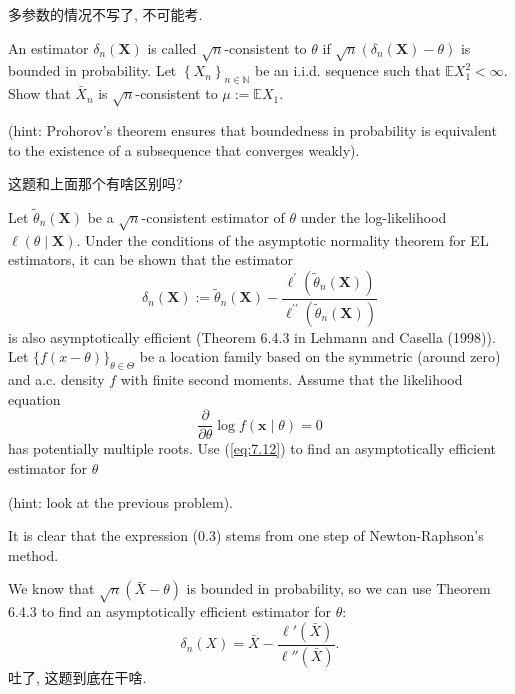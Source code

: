 \begin{solution}
    多参数的情况不写了, 不可能考. 
\end{solution}

\begin{ex}
    An estimator \(\delta_{n}(\mathbf{X})\) is called \(\sqrt{n}\)-consistent to \(\theta\) if \(\sqrt{n}\left(\delta_{n}(\mathbf{X})-\theta\right)\) is bounded in probability. Let \(\left\{X_{n}\right\}_{n \in \mathbb{N}}\) be an i.i.d. sequence such that \(\mathbb{E} X_{1}^{2}<\infty\). Show that \(\bar{X}_{n}\) is \(\sqrt{n}\)-consistent to \(\mu:=\mathbb{E} X_{1}\). 
    
    (hint: Prohorov's theorem ensures that boundedness in probability is equivalent to the existence of a subsequence that converges weakly). 
\end{ex}

\begin{solution}
    这题和上面那个有啥区别吗? 
\end{solution}

\begin{ex}
    Let \(\tilde{\theta}_{n}(\mathbf{X})\) be a \(\sqrt{n}\)-consistent estimator of \(\theta\) under the log-likelihood \(\ell(\theta \mid \mathbf{X})\). Under the conditions of the asymptotic normality theorem for EL estimators, it can be shown that the estimator
    \begin{equation}
        \label{eq:7.12}
        \delta_{n}(\mathbf{X}):=\tilde{\theta}_{n}(\mathbf{X})-\frac{\ell^{\prime}\left(\tilde{\theta}_{n}(\mathbf{X})\right)}{\ell^{\prime \prime}\left(\tilde{\theta}_{n}(\mathbf{X})\right)}
    \end{equation}
    is also asymptotically efficient (Theorem 6.4.3 in Lehmann and Casella (1998)).
    Let \(\{f(x-\theta)\}_{\theta \in \Theta}\) be a location family based on the symmetric (around zero) and a.c. density \(f\) with finite second moments. Assume that the likelihood equation
    \[
    \frac{\partial}{\partial \theta} \log f(\mathbf{x} \mid \theta)=0
    \]
    has potentially multiple roots. Use (\ref{eq:7.12}) to find an asymptotically efficient estimator for \(\theta\) 

    (hint: look at the previous problem). 

     It is clear that the expression (0.3) stems from one step of Newton-Raphson's method.
\end{ex}

\begin{solution}
    We know that $\sqrt{n}(\bar{X}-\theta)$ is bounded in probability, so we can use Theorem 6.4.3 to find an asymptotically efficient estimator for $\theta$: 
    \[
        \delta_n(X)=\bar{X}-\frac{\ell'(\bar{X})}{\ell''(\bar{X})}. 
    \]
    吐了, 这题到底在干啥. 
\end{solution}

